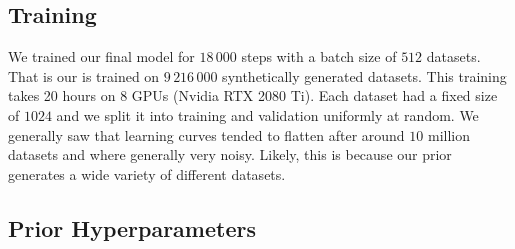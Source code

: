 \documentclass{article}
\begin{document}
\subsection{\methodname{} Training}
We trained our final model for $18\,000$ steps with a batch size of $512$ datasets. That is our \methodname{} is trained on $9\,216\,000$ synthetically generated datasets. This training takes 20 hours on 8 GPUs (Nvidia RTX 2080 Ti). Each dataset had a fixed size of $1024$ and we split it into training and validation uniformly at random. We generally saw that learning curves tended to flatten after around $10$ million datasets and where generally very noisy. Likely, this is because our prior generates a wide variety of different datasets.

\subsection{Prior Hyperparameters}
\label{app:prior_hparams}
\end{document}
